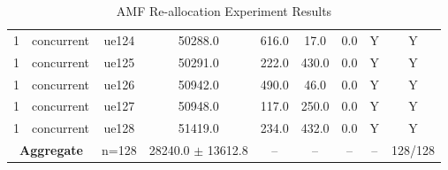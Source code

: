 \begin{table}[ht]
\begin{tabular}{|c|c|c|c|c|c|c|c|c|}
1 & concurrent & ue124 & 50288.0 & 616.0 & 17.0 & 0.0 & Y & Y \\
1 & concurrent & ue125 & 50291.0 & 222.0 & 430.0 & 0.0 & Y & Y \\
1 & concurrent & ue126 & 50942.0 & 490.0 & 46.0 & 0.0 & Y & Y \\
1 & concurrent & ue127 & 50948.0 & 117.0 & 250.0 & 0.0 & Y & Y \\
1 & concurrent & ue128 & 51419.0 & 234.0 & 432.0 & 0.0 & Y & Y \\
\multicolumn{2}{|c|}{\textbf{Aggregate}} & n=128 & 28240.0 $\pm$ 13612.8 & -- & -- & -- & -- & 128/128 \\
\hline
\end{tabular}
\caption{AMF Re-allocation Experiment Results}
\label{tab:amf_realloc}
\end{table}
